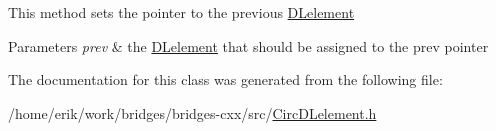 This method sets the pointer to the previous \hyperlink{classbridges_1_1datastructure_1_1_d_lelement}{D\+Lelement} 
\begin{DoxyParams}{Parameters}
{\em prev} & the \hyperlink{classbridges_1_1datastructure_1_1_d_lelement}{D\+Lelement} that should be assigned to the prev pointer \\
\hline
\end{DoxyParams}


The documentation for this class was generated from the following file\+:\begin{DoxyCompactItemize}
\item 
/home/erik/work/bridges/bridges-\/cxx/src/\hyperlink{_circ_d_lelement_8h}{Circ\+D\+Lelement.\+h}\end{DoxyCompactItemize}
